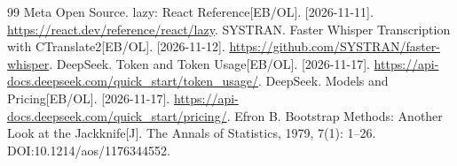 \documentclass[UTF8,zihao=-4,fontset=none,a4paper]{ctexart}
\begin{document}
\begin{thebibliography}{99}
Meta Open Source. lazy: React Reference[EB/OL]. [2026-11-11]. \url{https://react.dev/reference/react/lazy}.
SYSTRAN. Faster Whisper Transcription with CTranslate2[EB/OL]. [2026-11-12]. \url{https://github.com/SYSTRAN/faster-whisper}.
DeepSeek. Token and Token Usage[EB/OL]. [2026-11-17]. \url{https://api-docs.deepseek.com/quick_start/token_usage/}.
DeepSeek. Models and Pricing[EB/OL]. [2026-11-17]. \url{https://api-docs.deepseek.com/quick_start/pricing/}.
Efron B. Bootstrap Methods: Another Look at the Jackknife[J]. The Annals of Statistics, 1979, 7(1): 1--26. DOI:10.1214/aos/1176344552.
\end{thebibliography}
\end{document}

